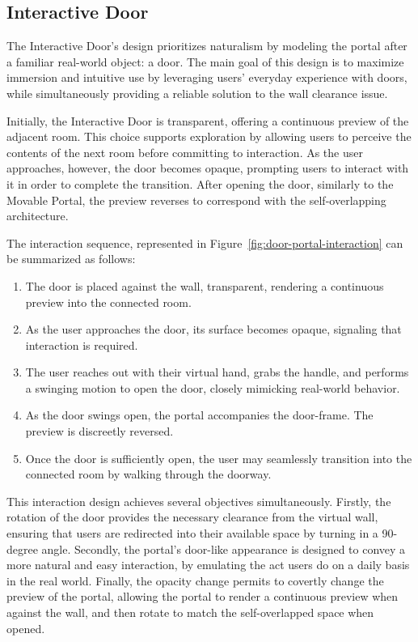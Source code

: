 \subsection{Interactive Door}
\label{sec:int-door-design}

The Interactive Door's design prioritizes naturalism by modeling the portal after a familiar real-world object: a door. The main goal of this design 
is to maximize immersion and intuitive use by leveraging users' everyday experience with doors, while simultaneously providing a reliable solution 
to the wall clearance issue. 

Initially, the Interactive Door is transparent, offering a continuous preview of the adjacent room. This choice supports exploration by allowing 
users to perceive the contents of the next room before committing to interaction. As the user approaches, however, the door becomes opaque, 
prompting users to interact with it in order to complete the transition. After opening the door, similarly to the Movable Portal, the preview 
reverses to correspond with the self-overlapping architecture.

The interaction sequence, represented in Figure~\ref{fig:door-portal-interaction} can be summarized as follows:

\begin{enumerate}
  \item The door is placed against the wall, transparent, rendering a continuous preview into the connected room.
  \item As the user approaches the door, its surface becomes opaque, signaling that interaction is required.
  \item The user reaches out with their virtual hand, grabs the handle, and performs a swinging motion to open the door, closely mimicking 
  real-world behavior.
  \item As the door swings open, the portal accompanies the door-frame. The preview is discreetly reversed.
  \item Once the door is sufficiently open, the user may seamlessly transition into the connected room by walking through the doorway.
\end{enumerate}

This interaction design achieves several objectives simultaneously. Firstly, the rotation of the door provides the necessary clearance from the 
virtual wall, ensuring that users are redirected into their available space by turning in a 90-degree angle. Secondly, the portal's door-like 
appearance is designed to convey a more natural and easy interaction, by emulating the act users do on a daily basis in the real world. 
Finally, the opacity change permits to covertly change the preview of the portal, allowing the portal to render a continuous preview when 
against the wall, and then rotate to match the self-overlapped space when opened.


